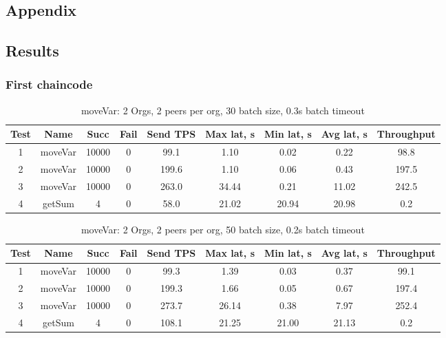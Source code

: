 \begin{appendices}
\chapter{Appendix}

\section{Results} \label{apdx:1}
\subsection{First chaincode} \label{apdx:fst}

\begin{table}[H]
\begin{center}
\begin{tabular}{ |c|c|c|c|c|c|c|c|c| }
 \hline
  Test & Name & Succ  & Fail & Send TPS & Max lat, s & Min lat, s & Avg lat, s & Throughput \\
 \hline
 \hline
 1    & moveVar & 10000 & 0    & 99.1  & 1.10      & 0.02      & 0.22      & 98.8 \\
 \hline
 2    & moveVar & 10000 & 0    & 199.6 & 1.10      & 0.06      & 0.43      & 197.5 \\
 \hline
 3    & moveVar & 10000 & 0    & 263.0 & 34.44     & 0.21      & 11.02     & 242.5 \\
 \hline
 4    & getSum  & 4     & 0    & 58.0  & 21.02     & 20.94     & 20.98     & 0.2 \\
 \hline
\end{tabular}
\end{center}
\caption{moveVar: 2 Orgs, 2 peers per org, 30 batch size, 0.3s batch timeout}
\end{table}

\begin{table}[H]
\begin{center}
\begin{tabular}{ |c|c|c|c|c|c|c|c|c| }
 \hline
  Test & Name & Succ  & Fail & Send TPS & Max lat, s & Min lat, s & Avg lat, s & Throughput \\
 \hline
 \hline
 1    & moveVar & 10000 & 0    & 99.3  & 1.39      & 0.03      & 0.37      & 99.1   \\
 \hline
 2    & moveVar & 10000 & 0    & 199.3 & 1.66      & 0.05      & 0.67      & 197.4  \\
 \hline
 3    & moveVar & 10000 & 0    & 273.7 & 26.14     & 0.38      & 7.97      & 252.4  \\
 \hline
 4    & getSum  & 4     & 0    & 108.1 & 21.25     & 21.00     & 21.13     & 0.2    \\
 \hline
\end{tabular}
\end{center}
\caption{moveVar: 2 Orgs, 2 peers per org, 50 batch size, 0.2s batch timeout}
\end{table}


\end{appendices}
